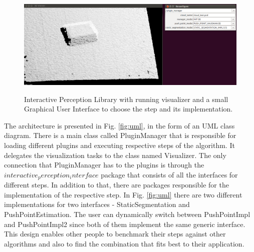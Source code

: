 \begin{figure}

{\includegraphics[width=1.1\columnwidth]{figures/ipl.png}}

\caption{Interactive Perception Library with running visualizer and a small Graphical User Interface to choose the step and its implementation.}
\label{fig:ipl}
\end{figure}

The architecture is presented in Fig. \ref{fig:uml}, in the form of an UML class diagram. There is a main class called PluginManager that is responsible for loading different plugins and executing respective steps of the algorithm. It delegates the visualization tasks to the class named Visualizer. The only connection that PluginManager has to the plugins is through the $interactive_perception_interface$ package that consists of all the interfaces for different steps. In addition to that, there are packages responsible for the implementation of the respective step. In Fig. \ref{fig:uml} there are two different implementations for two interfaces - StaticSegmentation and PushPointEstimation. The user can dynamically switch between PushPointImpl and PushPointImpl2 since both of them implement the same generic interface. This design enables other people to benchmark their steps against other algorithms and also to find the combination that fits best to their application.  

